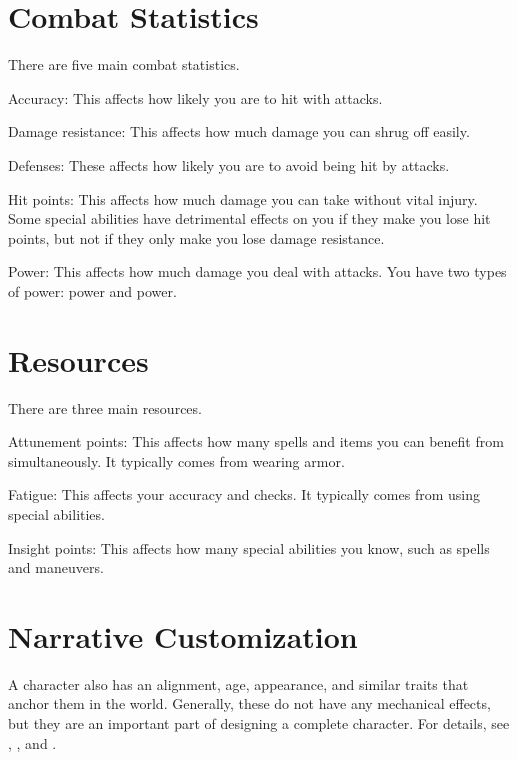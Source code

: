 \section{Combat Statistics}\label{Combat Statistics}
  There are five main combat statistics.
  \begin{raggeditemize}
    \item Accuracy: This affects how likely you are to hit with attacks.
    \item Damage resistance: This affects how much damage you can shrug off easily.
    \item Defenses: These affects how likely you are to avoid being hit by attacks.
    \item Hit points: This affects how much damage you can take without vital injury.
      Some special abilities have detrimental effects on you if they make you lose hit points, but not if they only make you lose damage resistance.
    \item Power: This affects how much damage you deal with attacks.
      You have two types of power: \magical power and  power.
  \end{raggeditemize}

\section{Resources}
  There are three main resources.
  \begin{raggeditemize}
    \item Attunement points: This affects how many spells and items you can benefit from simultaneously.
      It typically comes from wearing armor.
    \item Fatigue: This affects your accuracy and checks.
      It typically comes from using special abilities.
    \item Insight points: This affects how many special abilities you know, such as spells and maneuvers.
  \end{raggeditemize}

\section{Narrative Customization}
  A character also has an alignment, age, appearance, and similar traits that anchor them in the world.
  Generally, these do not have any mechanical effects, but they are an important part of designing a complete character.
  For details, see , , and .

